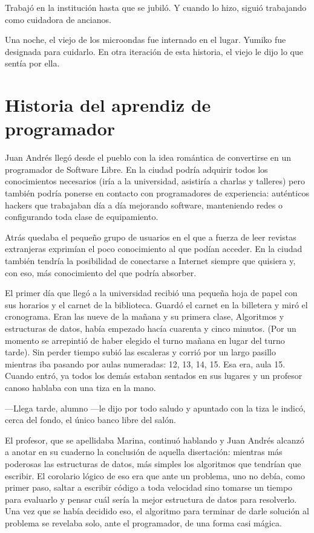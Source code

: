 \documentclass[12pt,twoside,openright]{book}
\begin{document}
Trabajó en la institución hasta que se jubiló. Y cuando lo hizo, siguió trabajando como cuidadora de ancianos.

Una noche, el viejo de los microondas fue internado en el lugar. Yumiko fue designada para cuidarlo. En otra iteración de esta historia, el viejo le dijo lo que sentía por ella.


\chapter*{Historia del aprendiz de programador} 


Juan Andrés llegó desde el pueblo con la idea romántica de convertirse en un programador de Software Libre. En la ciudad podría adquirir todos los conocimientos necesarios (iría a la universidad, asistiría a charlas y talleres) pero también podría ponerse en contacto con programadores de experiencia: auténticos hackers que trabajaban día a día mejorando software, manteniendo redes o configurando toda clase de equipamiento.

Atrás quedaba el pequeño grupo de usuarios en el que a fuerza de leer revistas extranjeras exprimían el poco conocimiento al que podían acceder. En la ciudad también tendría la posibilidad de conectarse a Internet siempre que quisiera y, con eso, más conocimiento del que podría absorber.

El primer día que llegó a la universidad recibió una pequeña hoja de papel con sus horarios y el carnet de la biblioteca. Guardó el carnet en la billetera y miró el cronograma. Eran las nueve de la mañana y su primera clase, Algoritmos y estructuras de datos, había empezado hacía cuarenta y cinco minutos. (Por un momento se arrepintió de haber elegido el turno mañana en lugar del turno tarde). Sin perder tiempo subió las escaleras y corrió por un largo pasillo mientras iba pasando por aulas numeradas: 12, 13, 14, 15. Esa era, aula 15. Cuando entró, ya todos los demás estaban sentados en sus lugares y un profesor canoso hablaba con una tiza en la mano.

---Llega tarde, alumno ---le dijo por todo saludo y apuntado con la tiza le indicó, cerca del fondo, el único banco libre del salón.

El profesor, que se apellidaba Marina, continuó hablando y Juan Andrés alcanzó a anotar en su cuaderno la conclusión de aquella disertación: mientras más poderosas las estructuras de datos, más simples los algoritmos que tendrían que escribir. El corolario lógico de eso era que ante un problema, uno no debía, como primer paso, saltar a escribir código a toda velocidad sino tomarse un tiempo para evaluarlo y pensar cuál sería la mejor estructura de datos para resolverlo. Una vez que se había decidido eso, el algoritmo para terminar de darle solución al problema se revelaba solo, ante el programador, de una forma casi mágica.
\end{document}
